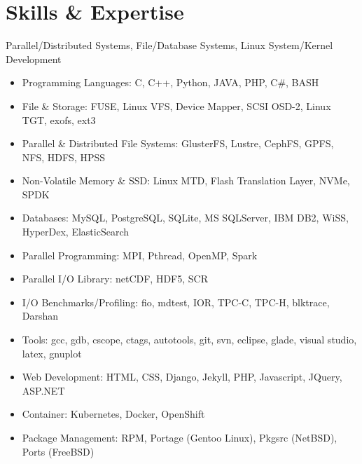 \section{Skills \& Expertise}
Parallel/Distributed Systems, File/Database Systems, Linux System/Kernel Development
\begin{itemize}
\item {Programming Languages}: C, C++, Python, JAVA, PHP, C\#, BASH
\item {File \& Storage}: FUSE, Linux VFS, Device Mapper, SCSI OSD-2, Linux TGT, exofs, ext3
\item {Parallel \& Distributed File Systems}: GlusterFS, Lustre, CephFS, GPFS, NFS, HDFS, HPSS
\item {Non-Volatile Memory \& SSD}: Linux MTD, Flash Translation Layer, NVMe, SPDK
\item {Databases}: MySQL, PostgreSQL, SQLite, MS SQLServer, IBM DB2, WiSS, HyperDex, ElasticSearch
\item {Parallel Programming}: MPI, Pthread, OpenMP, Spark
\item {Parallel I/O Library}: netCDF, HDF5, SCR
\item {I/O Benchmarks/Profiling}: fio, mdtest, IOR, TPC-C, TPC-H, blktrace, Darshan
\item {Tools}: gcc, gdb, cscope, ctags, autotools, git, svn, eclipse, glade, visual studio, latex, gnuplot
\item {Web Development}: HTML, CSS, Django, Jekyll, PHP, Javascript, JQuery, ASP.NET
\item {Container}: Kubernetes, Docker, OpenShift
\item {Package Management}: RPM, Portage (Gentoo Linux), Pkgsrc (NetBSD), Ports (FreeBSD)
\end{itemize}

